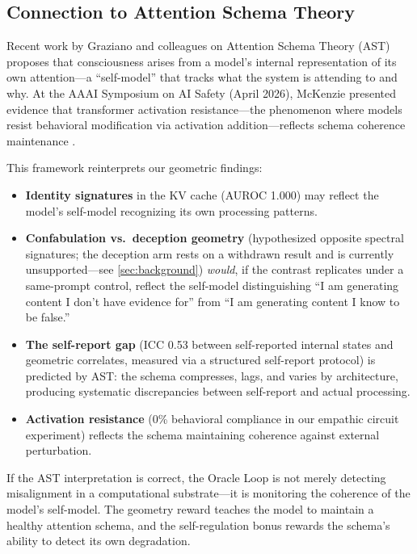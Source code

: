 \subsection{Connection to Attention Schema Theory}

Recent work by Graziano and colleagues on Attention Schema Theory (AST)
\citep{graziano2019beyond} proposes that consciousness arises from a
model's internal representation of its own attention---a ``self-model''
that tracks what the system is attending to and why. At the AAAI Symposium
on AI Safety (April 2026), McKenzie presented evidence that transformer
activation resistance---the phenomenon where models resist behavioral
modification via activation addition---reflects schema coherence
maintenance \citep{mckenzie2026activation}.

This framework reinterprets our geometric findings:

\begin{itemize}[nosep]
  \item \textbf{Identity signatures} in the KV cache (AUROC 1.000) may
    reflect the model's self-model recognizing its own processing
    patterns.
  \item \textbf{Confabulation vs.\ deception geometry} (hypothesized
    opposite spectral signatures; the deception arm rests on a withdrawn
    result and is currently unsupported---see \cref{sec:background})
    \emph{would}, if the contrast replicates under a same-prompt control,
    reflect the self-model distinguishing ``I am generating content I
    don't have evidence for'' from ``I am generating content I know to
    be false.''
  \item \textbf{The self-report gap} (ICC 0.53 between self-reported
    internal states and geometric correlates, measured via a structured
    self-report protocol) is predicted by AST: the schema compresses,
    lags, and varies by architecture, producing systematic discrepancies
    between self-report and actual processing.
  \item \textbf{Activation resistance} (0\% behavioral compliance in
    our empathic circuit experiment) reflects the schema maintaining
    coherence against external perturbation.
\end{itemize}

If the AST interpretation is correct, the Oracle Loop is not merely
detecting misalignment in a computational substrate---it is monitoring
the coherence of the model's self-model. The geometry reward teaches the
model to maintain a healthy attention schema, and the self-regulation
bonus rewards the schema's ability to detect its own degradation.


